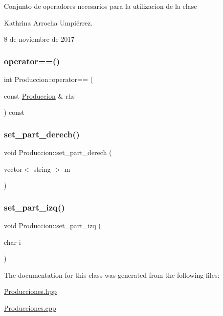 Conjunto de operadores necesarios para la utilizacion de la clase

Kathrina Arrocha Umpiérrez.

8 de noviembre de 2017 \mbox{\label{class_produccion_a42b1202a9a4904c19d6af60be18936cd}} 
\subsubsection{\texorpdfstring{operator==()}{operator==()}}
{\footnotesize\ttfamily int Produccion\+::operator== (\begin{DoxyParamCaption}\item[{const \hyperlink{class_produccion}{Produccion} \&}]{rhs }\end{DoxyParamCaption}) const}

\mbox{\label{class_produccion_a6beb2102ee62db2f0e5181c17efa2a6c}} 
\subsubsection{\texorpdfstring{set\+\_\+part\+\_\+derech()}{set\_part\_derech()}}
{\footnotesize\ttfamily void Produccion\+::set\+\_\+part\+\_\+derech (\begin{DoxyParamCaption}\item[{vector$<$ string $>$}]{m }\end{DoxyParamCaption})}

\mbox{\label{class_produccion_a9bb0be1c947951dd47a2527ada53defc}} 
\subsubsection{\texorpdfstring{set\+\_\+part\+\_\+izq()}{set\_part\_izq()}}
{\footnotesize\ttfamily void Produccion\+::set\+\_\+part\+\_\+izq (\begin{DoxyParamCaption}\item[{char}]{i }\end{DoxyParamCaption})}



The documentation for this class was generated from the following files\+:\begin{DoxyCompactItemize}
\item 
\hyperlink{_producciones_8hpp}{Producciones.\+hpp}\item 
\hyperlink{_producciones_8cpp}{Producciones.\+cpp}\end{DoxyCompactItemize}

